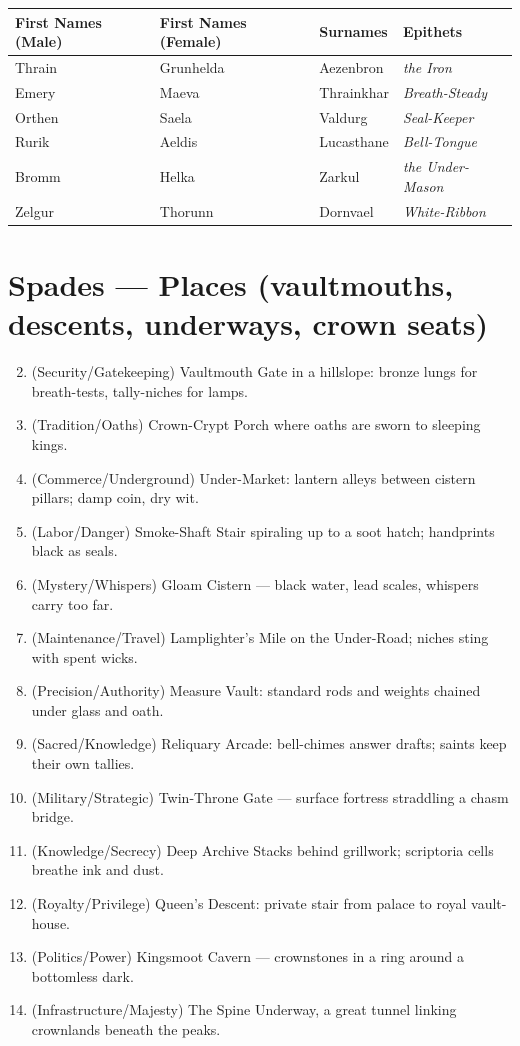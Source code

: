 \begin{longtable}{|p{}|p{}|p{}|p{}|}
\hline
\textbf{First Names (Male)} & \textbf{First Names (Female)} & \textbf{Surnames} & \textbf{Epithets} \\
\hline
Thrain & Grunhelda & Aezenbron & \textit{the Iron} \\
\hline
Emery & Maeva & Thrainkhar & \textit{Breath-Steady} \\
\hline
Orthen & Saela & Valdurg & \textit{Seal-Keeper} \\
\hline
Rurik & Aeldis & Lucasthane & \textit{Bell-Tongue} \\
\hline
Bromm & Helka & Zarkul & \textit{the Under-Mason} \\
\hline
Zelgur & Thorunn & Dornvael & \textit{White-Ribbon} \\
\hline
\end{longtable}

\section*{Spades --- Places (vaultmouths, descents, underways, crown seats)}
\label{sec:aeler-places}
\begin{enumerate}
\setcounter{enumi}{1}
\item {} (Security/Gatekeeping) Vaultmouth Gate in a hillslope: bronze lungs for breath-tests, tally-niches for lamps.
\item {} (Tradition/Oaths) Crown-Crypt Porch where oaths are sworn to sleeping kings.
\item {} (Commerce/Underground) Under-Market: lantern alleys between cistern pillars; damp coin, dry wit.
\item {} (Labor/Danger) Smoke-Shaft Stair spiraling up to a soot hatch; handprints black as seals.
\item {} (Mystery/Whispers) Gloam Cistern --- black water, lead scales, whispers carry too far.
\item {} (Maintenance/Travel) Lamplighter's Mile on the Under-Road; niches sting with spent wicks.
\item {} (Precision/Authority) Measure Vault: standard rods and weights chained under glass and oath.
\item {} (Sacred/Knowledge) Reliquary Arcade: bell-chimes answer drafts; saints keep their own tallies.
\item {} (Military/Strategic) Twin-Throne Gate --- surface fortress straddling a chasm bridge.
\item {} (Knowledge/Secrecy) Deep Archive Stacks behind grillwork; scriptoria cells breathe ink and dust.
\item {} (Royalty/Privilege) Queen's Descent: private stair from palace to royal vault-house.
\item {} (Politics/Power) Kingsmoot Cavern --- crownstones in a ring around a bottomless dark.
\item {} (Infrastructure/Majesty) The Spine Underway, a great tunnel linking crownlands beneath the peaks.
\end{enumerate}

